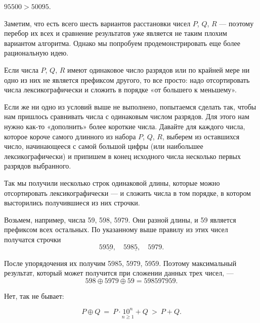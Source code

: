 ﻿
\begin{itemize}
\itA $95500 > 50095$.

\itB Заметим, что есть всего шесть вариантов расстановки чисел $P$, $Q$, $R$ — поэтому перебор их всех и сравнение результатов уже является не таким плохим вариантом алгоритма. Однако мы попробуем продемонстрировать еще более рациональную идею.

Если числа $P$, $Q$, $R$ имеют одинаковое число разрядов или по крайней мере ни одно из них не является префиксом другого, то все просто: надо отсортировать числа лексикографически и сложить в порядке «от большего к меньшему».

Если же ни одно из условий выше не выполнено, попытаемся сделать так, чтобы нам пришлось сравнивать числа с одинаковым числом разрядов. Для этого нам нужно как-то «дополнить» более короткие числа. Давайте для каждого числа, которое короче самого длинного из набора $P$, $Q$, $R$, выберем из оставшихся число, начинающееся с самой большой цифры (или наибольшее лексикографически) и припишем в конец исходного числа несколько первых разрядов выбранного.

Так мы получили несколько строк одинаковой длины, которые можно отсортировать лексикографически — и сложить числа в том порядке, в котором высторились получившиеся из них строчки.

Возьмем, например, числа 59, 598, 5979. Они разной длины, и 59 является префиксом всех остальных. По указанному выше правилу из этих чисел получатся строчки
	$$59\underline{59},\quad 598\underline{5},\quad 5979.$$

После упорядочения их получим 5985, 5979, 5959. Поэтому максимальный результат, который может получится при сложении данных трех чисел, —
	$$598 \oplus 5979 \oplus 59 = 598597959.$$

\itC Нет, так не бывает:

$$P \oplus Q\ =\ P \cdot \underset{n\geq1}{10^n} + Q\ >\ P+Q.$$
\end{itemize}